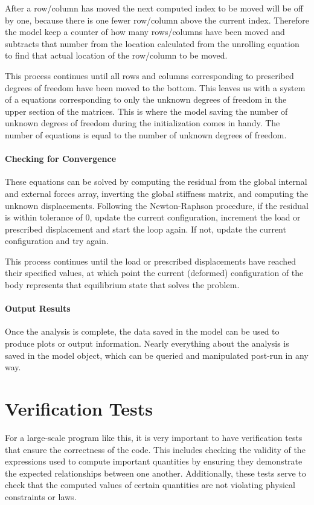 \documentclass[]{spie}  %
\begin{document}
After a row/column has moved the next computed index to be moved will be off by one, because there is one fewer row/column above the current index. Therefore the model keep a counter of how many rows/columns have been moved and subtracts that number from the location calculated from the unrolling equation to find that actual location of the row/column to be moved.

This process continues until all rows and columns corresponding to prescribed degrees of freedom have been moved to the bottom. This leaves us with a system of a equations corresponding to only the unknown degrees of freedom in the upper section of the matrices. This is where the model saving the number of unknown degrees of freedom during the initialization comes in handy. The number of equations is equal to the number of unknown degrees of freedom. 

\paragraph{Checking for Convergence}
These equations can be solved by computing the residual from the global internal and external forces array, inverting the global stiffness matrix, and computing the unknown displacements. Following the Newton-Raphson procedure, if the residual is within tolerance of 0, update the current configuration, increment the load or prescribed displacement and start the loop again. If not, update the current configuration and try again. 

This process continues until the load or prescribed displacements have reached their specified values, at which point the current (deformed) configuration of the body represents that equilibrium state that solves the problem.

\paragraph{Output Results}
Once the analysis is complete, the data saved in the model can be used to produce plots or output information. Nearly everything about the analysis is saved in the model object, which can be queried and manipulated post-run in any way.

\section{Verification Tests}
For a large-scale program like this, it is very important to have verification tests that ensure the correctness of the code. This includes checking the validity of the expressions used to compute important quantities by ensuring they demonstrate the expected relationships between one another. Additionally, these tests serve to check that the computed values of certain quantities are not violating physical constraints or laws.
\end{document}
